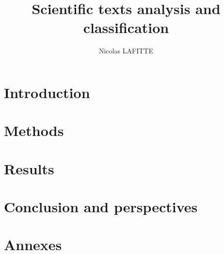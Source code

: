\documentclass[]{report}
\title{Scientific texts analysis and classification}
\author{Nicolas LAFITTE}
\begin{document}
\maketitle



\tableofcontents

\chapter{Introduction}
\chapter{Methods}

\chapter{Results}
\chapter{Conclusion and perspectives}
\chapter{Annexes}
\end{document}
